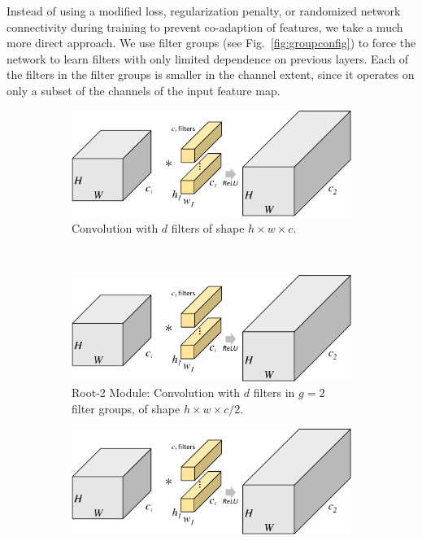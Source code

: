 \documentclass[thesis]{subfiles}
\begin{document}
	Instead of using a modified loss, regularization penalty, or randomized network connectivity during training to prevent co-adaption of features, we take a much more direct approach. We use filter groups (see Fig.~\ref{fig:groupconfig}) to force the network to learn filters with only limited dependence on previous layers. Each of the filters in the filter groups is smaller in the channel extent, since it operates on only a subset of the channels of the input feature map. 
	
	\begin{figure}[tb]
		\centering
		\begin{subfigure}[b]{0.6\linewidth}
			\centering
			\includegraphics[width=\linewidth, page=4]{Figs/PDF/groupfig}
			\caption{Convolution with $d$ filters of shape $h\times w\times c$.}
			\label{fig:normalresnet}
		\end{subfigure}\\
		\begin{subfigure}[b]{0.6\linewidth}
			\includegraphics[width=\linewidth, page=5]{Figs/PDF/groupfig}
			\caption{Root-2 Module: Convolution with $d$ filters in $g = 2$ filter groups, of shape $h\times w\times c/2$.}
			\label{fig:rootresnet2}
		\end{subfigure}
		\begin{subfigure}[b]{0.6\linewidth}
			\includegraphics[width=\linewidth, page=6]{Figs/PDF/groupfig}

\end{subfigure}
\end{figure}
\end{document}
